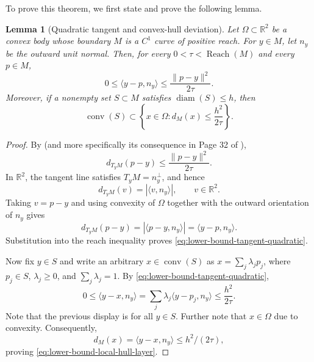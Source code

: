 \documentclass{article}
\newtheorem{lemma}{Lemma}
\newcommand{\R}{\mathbb R}
\newcommand{\Reach}{\operatorname{Reach}}
\newcommand{\diam}{\operatorname{diam}}
\numberwithin{equation}{section}
\begin{document}
To prove this theorem, we first state and prove the following lemma.
\begin{lemma}[Quadratic tangent and convex-hull deviation]
\label{lem:convex-reach-tangent}
Let $\Omega\subset\R^2$ be a convex body whose boundary $M$ is a
$C^1$ curve of positive reach. For $y\in M$, let $n_y$ be the outward
unit normal. Then, for every $0<\tau<\Reach(M)$ and every $p\in M$,
\begin{equation}
 0\le \langle y-p,n_y\rangle
 \le \frac{\|p-y\|^2}{2\tau}.
\label{eq:lower-bound-tangent-quadratic}
\end{equation}
Moreover, if a nonempty set $S\subset M$ satisfies $\diam(S)\le h$, then
\begin{equation}
 \operatorname{conv}(S)
 \subset
 \left\{x\in\Omega:d_M(x)\le\frac{h^2}{2\tau}\right\}.
\label{eq:lower-bound-local-hull-layer}
\end{equation}
\end{lemma}

\begin{proof}
By \citet[Theorem~4.18]{federer1959curvature} (and more specifically its consequence in Page 32 of \cite{aamari2017thesis}),
\[
 d_{T_yM}(p-y)\le \frac{\|p-y\|^2}{2\tau}.
\]
In $\R^2$, the tangent line satisfies $T_yM=n_y^\perp$, and hence
\[
 d_{T_yM}(v)=|\langle v,n_y\rangle|,
 \qquad v\in\R^2.
\]
Taking $v=p-y$ and using convexity of $\Omega$ together with the outward
orientation of $n_y$ gives
\[
 d_{T_yM}(p-y)=|\langle p-y,n_y\rangle|
 =\langle y-p,n_y\rangle.
\]
Substitution into the reach inequality proves
\eqref{eq:lower-bound-tangent-quadratic}.

Now fix $y\in S$ and write an arbitrary $x\in\operatorname{conv}(S)$ as
$x=\sum_j\lambda_jp_j$, where $p_j\in S$, $\lambda_j\ge0$, and
$\sum_j\lambda_j=1$. By \eqref{eq:lower-bound-tangent-quadratic},
\[
 0\le\langle y-x,n_y\rangle
 =\sum_j\lambda_j\langle y-p_j,n_y\rangle
 \le\frac{h^2}{2\tau}.
\]
Note that the previous display is for all $y\in S$. Further note that $x\in\Omega$ due to convexity.  Consequently,
$$d_M(x)=\langle y-x,n_y\rangle\le h^2/(2\tau),$$ proving
\eqref{eq:lower-bound-local-hull-layer}.
\end{proof}
\end{document}
